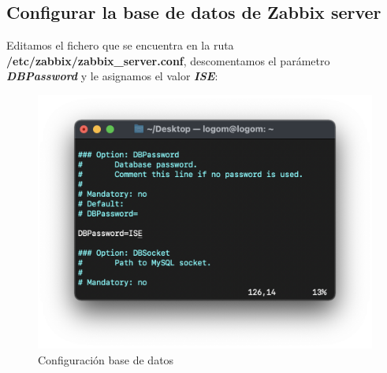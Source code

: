     \subsection{Configurar la base de datos de Zabbix server}
    Editamos el fichero que se encuentra en la ruta \textbf{/etc/zabbix/zabbix\_server.conf}, descomentamos el parámetro \textbf{\emph{DBPassword}} y le asignamos el valor
    \textbf{\emph{ISE}}:
    \begin{figure}[H]
        \centering
        \includegraphics[scale=0.4]{images/zabbix_server_conf.png}
        \caption{Configuración base de datos}
        \label{fig:zabbix_conf}
    \end{figure}

